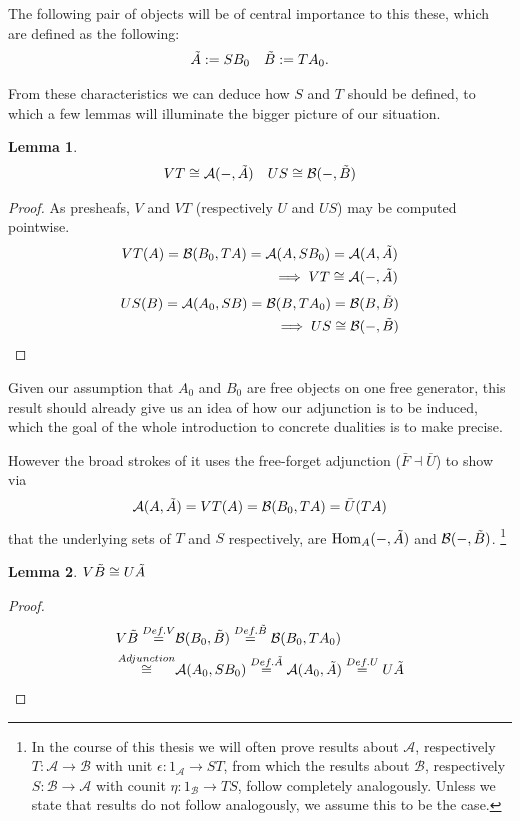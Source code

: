 \documentclass[12pt,a4paper]{article}
\newtheorem{lemma}{Lemma}[section] %
\DeclareMathOperator{\Hom}{Hom}
\def\HomA{\ensuremath\mathcal{A}}
\def\HomB{\ensuremath\mathcal{B}}
\def\t{\ensuremath\tilde}
\begin{document}
The following pair of objects will be of central importance to this these, which are defined as the following:
\begin{align*}
	\t A := SB_0&&
	\t B := TA_0.
\end{align*}


From these characteristics we can deduce how $S$ and $T$ should be defined, to which a few lemmas will illuminate the bigger picture of our situation.
\begin{lemma}
\begin{align*}
		VT \cong \HomA(-, \t  A)&&
	US \cong \HomB(-, \t  B)\\
\end{align*}
\end{lemma}
\begin{proof}
As presheafs, $V$ and $VT$ (respectively $U$ and $US$) may be computed pointwise. 
\begin{align*}
	VT(A) = \HomB(B_0, TA) = \HomA(A,SB_0) = \HomA(A, \t A) \\
	\implies VT \cong \HomA(-, \t A)
\end{align*}
\begin{align*}
	US(B) = \HomA(A_0, SB) = \HomB(B,TA_0) = \HomB(B, \t B) \\
	\implies US \cong \HomB(-, \t B)
\end{align*}
\end{proof}

Given our assumption that $A_0$ and $B_0$ are free objects on one free generator, this result should already give us an idea of how our adjunction is to be induced, which the goal of the whole introduction to concrete dualities is to make precise. 

However the broad strokes of it uses the free-forget  adjunction ($\bar F \dashv \bar U$)  to show via \begin{align*}
	\HomA(A, \t A) = VT(A) = \HomB(B_0, T A) = \bar U(TA)
\end{align*} 
that the underlying sets of $T$ and $S$ respectively, are $\Hom_A(-, \t A)$ and $\HomB(-, \t B)$. \footnote{In the course of this thesis we will often prove results about $\mathcal{A}$, respectively $T: \mathcal{A}\to \mathcal{B}$ with unit $\epsilon:1_\mathcal{A} \to ST $, from which the results about $\mathcal{B}$, respectively $S: \mathcal{B} \to \mathcal{A}$ with counit $\eta: 1_\mathcal{B} \to TS$, follow completely analogously. Unless we state that results do not follow analogously, we assume this to be the case.}

\begin{lemma}
	$V \t B \cong U \t A$
\end{lemma}
\begin{proof}
	\begin{align*}
		V \t B \stackrel{Def. V}{=}& \HomB(B_0,\t B) \stackrel{Def. \t B}{=} \HomB(B_0, TA_0)\\ \stackrel{Adjunction}{\cong}& \HomA(A_0,SB_0) \stackrel{Def. \t A}{=}\HomA(A_0,\t A) \stackrel{Def. U}{=} U\t A
	\end{align*} \end{proof}
	
\end{document}
